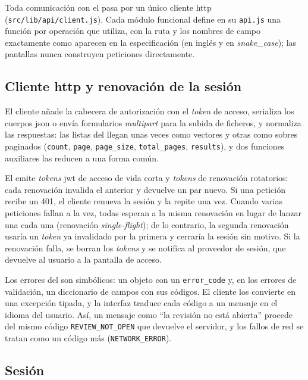 Toda comunicación con el  pasa por un único cliente \acs{http}
(\texttt{src/lib/api/client.js}). Cada módulo funcional define en su \texttt{api.js} una
función por operación que utiliza, con la ruta y los nombres de campo exactamente como
aparecen en la especificación (en inglés y en \textit{snake\_case}); las pantallas nunca
construyen peticiones directamente.

\subsection{Cliente \acs{http} y renovación de la sesión}

El cliente añade la cabecera de autorización con el \textit{token} de acceso, serializa los
cuerpos \acs{json} o envía formularios \textit{multipart} para la subida de ficheros, y
normaliza las respuestas: las listas del  llegan unas veces como vectores y
otras como sobres paginados (\texttt{count}, \texttt{page}, \texttt{page\_size},
\texttt{total\_pages}, \texttt{results}), y dos funciones auxiliares las reducen a una forma
común.

El  emite \textit{tokens} \acs{jwt} de acceso de vida corta y
\textit{tokens} de renovación rotatorios: cada renovación invalida el anterior y devuelve
un par nuevo. Si una petición recibe un 401, el cliente renueva la sesión y la repite una
vez. Cuando varias peticiones fallan a la vez, todas esperan a la misma renovación en lugar
de lanzar una cada una (renovación \emph{single-flight}); de lo contrario, la segunda
renovación usaría un \textit{token} ya invalidado por la primera y cerraría la sesión sin
motivo. Si la renovación falla, se borran los \textit{tokens} y se notifica al proveedor de
sesión, que devuelve al usuario a la pantalla de acceso.

Los errores del  son simbólicos: un objeto con un \texttt{error\_code} y, en
los errores de validación, un diccionario de campos con sus códigos. El cliente los
convierte en una excepción tipada, y la interfaz traduce cada código a un mensaje en el
idioma del usuario. Así, un mensaje como ``la revisión no está abierta'' procede del
mismo código \texttt{REVIEW\_NOT\_OPEN} que devuelve el servidor, y los fallos de red se
tratan como un código más (\texttt{NETWORK\_ERROR}).

\subsection{Sesión}

